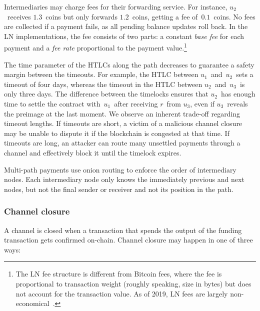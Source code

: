 Intermediaries may charge fees for their forwarding service.
For instance, $u_2$~receives $1.3$~coins but only forwards $1.2$~coins, getting a fee of~$0.1$~coins.
No fees are collected if a payment fails, as all pending balance updates roll back.
In the LN implementations, the fee consists of two parts: a constant \textit{base fee} for each payment and a \textit{fee rate} proportional to the payment value.\footnote{The LN fee structure is different from Bitcoin fees, where the fee is proportional to transaction weight (roughly speaking, size in bytes) but does not account for the transaction value. As of 2019, LN fees are largely non-economical~\cite{Beres2019}.}

The time parameter of the HTLCs along the path decreases to guarantee a safety margin between the timeouts.
For example, the HTLC between $u_1$~and~$u_2$~sets a timeout of four days, whereas the timeout in the HTLC between $u_2$~and~$u_3$~is only three days.
The difference between the timelocks ensures that $u_2$~has enough time to settle the contract with~$u_1$~after receiving $r$~from $u_3$, even if $u_3$~reveals the preimage at the last moment.
We observe an inherent trade-off regarding timeout lengths.
If timeouts are short, a victim of a malicious channel closure may be unable to dispute it if the blockchain is congested at that time.
If timeouts are long, an attacker can route many unsettled payments through a channel and effectively block it until the timelock expires.

Multi-path payments use onion routing to enforce the order of intermediary nodes.
Each intermediary node only knows the immediately previous and next nodes, but not the final sender or receiver and not its position in the path.


\subsubsection*{Channel closure}

A channel is closed when a transaction that spends the output of the funding transaction gets confirmed on-chain.
Channel closure may happen in one of three ways:


